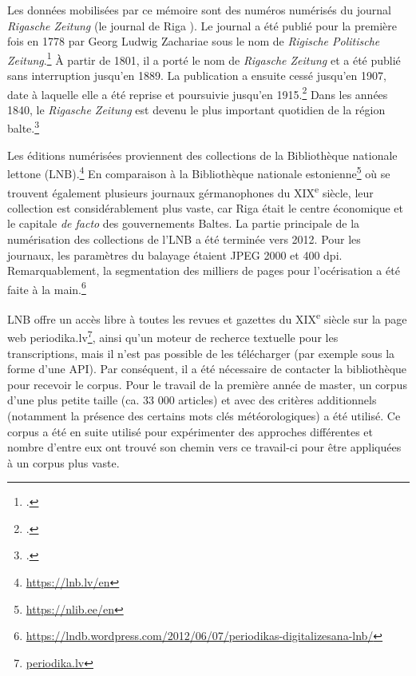 \documentclass[a4paper,twoside,12pt]{article}
\begin{document}
Les données mobilisées par ce mémoire sont des numéros numérisés du journal \textit{Rigasche Zeitung} (\og le journal de Riga \fg{}). Le journal a été publié pour la première fois en 1778 par Georg Ludwig Zachariae sous le nom de \textit{Rigische Politische Zeitung}.\footcite[Les éditeurs suivants au XIX\textsuperscript{e} siècle ont été Julius Conrad Daniel Müller (de 1808 à 1830) ; Heinrich Steffenhagen (1830 - ?) ; Adolf Müller ( ? - 1877) ; Georg Berkholz et Joh. Ad. Kröger (1877 - 1885) ; J. A. Kröger et J. C. Schwartz (1885 - 1889).][220]{annus_eestis_1993} À partir de 1801, il a porté le nom de \textit{Rigasche Zeitung} et a été publié sans interruption jusqu'en 1889. La publication a ensuite cessé jusqu'en 1907, date à laquelle elle a été reprise et poursuivie jusqu'en 1915.\footcite[220-222]{annus_eestis_1993} Dans les années 1840, le \textit{Rigasche Zeitung} est devenu le plus important quotidien de la région balte.\footcite[303]{andresen_eesti_2010}

Les éditions numérisées proviennent des collections de la Bibliothèque nationale lettone (LNB).\footnote{\url{https://lnb.lv/en}} En comparaison à la Bibliothèque nationale estonienne\footnote{\url{https://nlib.ee/en}} où se trouvent également plusieurs journaux gérmanophones du XIX\textsuperscript{e} siècle, leur collection est considérablement plus vaste, car Riga était le centre économique et le capitale \textit{de facto} des gouvernements Baltes. La partie principale de la numérisation des collections de l'LNB a été terminée vers 2012. Pour les journaux, les paramètres du balayage étaient JPEG 2000 et 400 dpi. Remarquablement, la segmentation des milliers de pages pour l'océrisation a été faite à la main.\footnote{\url{https://lndb.wordpress.com/2012/06/07/periodikas-digitalizesana-lnb/}}

LNB offre un accès libre à toutes les revues et gazettes du XIX\textsuperscript{e} siècle sur la page web periodika.lv\footnote{\url{periodika.lv}}, ainsi qu'un moteur de recherce textuelle pour les transcriptions, mais il n'est pas possible de les télécharger (par exemple sous la forme d'une API). Par conséquent, il a été nécessaire de contacter la bibliothèque pour recevoir le corpus. Pour le travail de la première année de master, un corpus d'une plus petite taille (ca. 33 000 articles) et avec des critères additionnels (notamment la présence des certains mots clés météorologiques) a été utilisé. Ce corpus a été en suite utilisé pour expérimenter des approches différentes et nombre d'entre eux ont trouvé son chemin vers ce travail-ci pour être appliquées à un corpus plus vaste.
\end{document}
